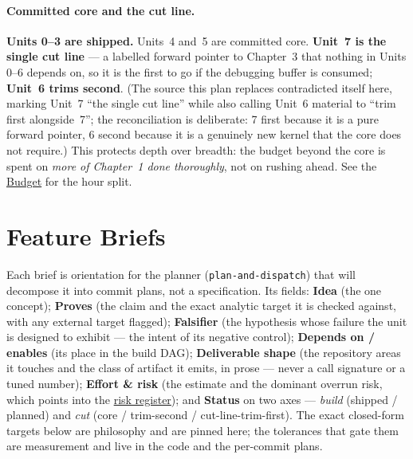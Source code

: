 \documentclass[11pt]{article}
\begin{document}
\paragraph{Committed core and the cut line.} \textbf{Units 0--3 are shipped.} Units~4 and~5 are
committed core. \textbf{Unit~7 is the single cut line} --- a labelled forward pointer to Chapter~3
that nothing in Units 0--6 depends on, so it is the first to go if the debugging buffer is consumed;
\textbf{Unit~6 trims second}. (The source this plan replaces contradicted itself here, marking Unit~7
``the single cut line'' while also calling Unit~6 material to ``trim first alongside~7''; the
reconciliation is deliberate: 7 first because it is a pure forward pointer, 6 second because it is a
genuinely new kernel that the core does not require.) This protects depth over breadth: the budget
beyond the core is spent on \emph{more of Chapter~1 done thoroughly}, not on rushing ahead. See the
\hyperref[sec:budget]{Budget} for the hour split.

\section{Feature Briefs}

Each brief is orientation for the planner (\texttt{plan-and-dispatch}) that will decompose it into
commit plans, not a specification. Its fields: \textbf{Idea} (the one concept); \textbf{Proves} (the
claim and the exact analytic target it is checked against, with any external target flagged);
\textbf{Falsifier} (the hypothesis whose failure the unit is designed to exhibit --- the intent of
its negative control); \textbf{Depends on / enables} (its place in the build DAG); \textbf{Deliverable
shape} (the repository areas it touches and the class of artifact it emits, in prose --- never a call
signature or a tuned number); \textbf{Effort \& risk} (the estimate and the dominant overrun risk,
which points into the \hyperref[sec:risk]{risk register}); and \textbf{Status} on two axes ---
\emph{build} (shipped / planned) and \emph{cut} (core / trim-second / cut-line-trim-first). The exact
closed-form targets below are philosophy and are pinned here; the tolerances that gate them are
measurement and live in the code and the per-commit plans.

\end{document}
